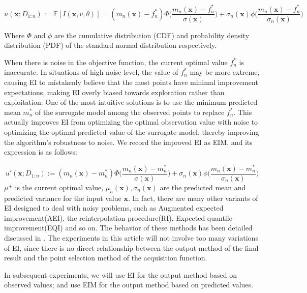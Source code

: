\documentclass{article}
\begin{document}
\begin{equation}\label{eq7}
	u(\textbf{x};D_{1:n}):=\mathbb{E}[\textit{I}(\textbf{x},v,\theta)]=(m_n(\textbf{x})-f^*_n)\Phi \Big(\frac{m_n(\textbf{x})-f^*_n}{\sigma(\textbf{x})}\Big)+\sigma_n(\textbf{x})\phi \Big(\frac{m_n(\textbf{x})-f^*_n}{\sigma_n(\textbf{x})} \Big)
\end{equation}

Where $\Phi$ and $\phi$ are the cumulative distribution (CDF) and probability density distribution (PDF) of the standard normal distribution respectively.

\hspace{2em}When there is noise in the objective function, the current optimal value $f^*_n$ is inaccurate. In situations of high noise level, the value of $f^*_n$ may be more extreme, causing EI to mistakenly believe that the
most points have minimal improvement expectations, making EI overly biased towards exploration rather than exploitation. One of the most intuitive solutions is to use the minimum predicted mean $m^*_n$ of the surrogate model among the observed points to replace $f^*_n$. This actually improves EI from optimizing the optimal observation value with noise to optimizing the optimal predicted value of the surrogate model, thereby improving the algorithm's robustness to noise. We record the improved EI as EIM, and its expression is as follows:

\begin{equation}\label{eq8}
	u'(\textbf{x};D_{1:n}):=(m_n(\textbf{x})-m^*_n)\Phi \Big(\frac{m_n(\textbf{x})-m^*_n}{\sigma(\textbf{x})}\Big)+\sigma_n(\textbf{x})\phi \Big(\frac{m_n(\textbf{x})-m^*_n}{\sigma_n(\textbf{x})} \Big)
\end{equation}
$\mu^+$ is the current optimal value, $\mu_n(\textbf{x}),\sigma_n(\textbf{x})$ are the predicted mean and predicted variance for the input value $\textbf{x}$. In fact, there are many other variants of EI designed to deal with noisy problems, such as Augmented expected improvement(AEI)\citep{Huang2006Global}, the reinterpolation procedure(RI)\citep{Forrester2006Design}, Expected quantile improvement(EQI)\citep{Picheny2012Quantile} and so on. The behavior of these methods has been detailed discussed in \citep{Picheny2013benchmark}. The experiments in this article will not involve too many variations of EI, since there is no direct relationship between the output method of the final result and the point selection method of the acquisition function.

\hspace{2em}In subsequent experiments, we will use EI for the output method based on observed values; and use EIM for the output method based on predicted values.
\end{document}
